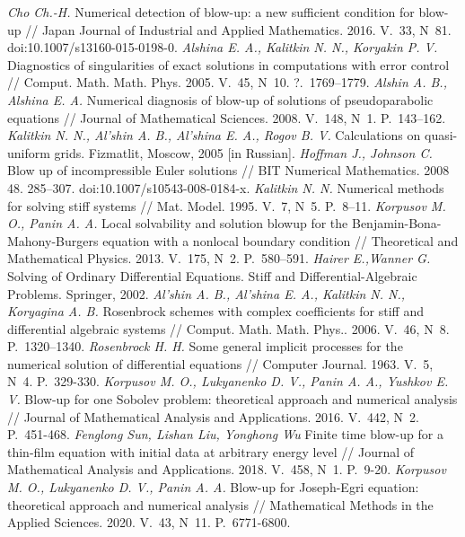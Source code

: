 \documentclass[twoside]{book}
\begin{document}
\begin{CJK*}{GBK}{song}
\begin{thebibliography}{s2}
     {\itshape Cho Ch.-H.} Numerical detection of blow-up: a new sufficient condition for blow-up // Japan Journal of Industrial and Applied Mathematics. 2016. V.~33, N~81. doi:10.1007/s13160-015-0198-0.
     {\itshape Alshina E. A., Kalitkin N. N., Koryakin P. V.} Diagnostics of singularities of exact solutions in computations with error control // Comput. Math. Math. Phys. 2005. V.~45, N~10.  ?.~1769--1779.
     {\itshape Alshin A. B., Alshina E. A.} Numerical diagnosis of blow-up of solutions of pseudoparabolic equations // Journal of Mathematical Sciences. 2008. V.~148, N~1. P.~143--162.
     {\itshape Kalitkin N. N., Al’shin A. B., Al’shina E. A., Rogov B. V.} Calculations on quasi-uniform grids. Fizmatlit, Moscow, 2005 [in Russian].
     {\itshape Hoffman J., Johnson C.} Blow up of incompressible Euler solutions // BIT Numerical Mathematics. 2008 48. 285--307. doi:10.1007/s10543-008-0184-x.
     {\itshape Kalitkin N. N.} Numerical methods for solving stiff systems  // Mat. Model. 1995. V.~7, N~5. P.~8--11.
     {\itshape Korpusov M. O., Panin A. A.} Local solvability and solution blowup for the Benjamin-Bona-Mahony-Burgers equation with a nonlocal boundary condition // Theoretical and Mathematical Physics. 2013. V.~175, N~2. P.~580--591.
     {\itshape Hairer E.,Wanner G.} Solving of Ordinary Differential Equations. Stiff and Differential-Algebraic Problems. Springer, 2002.
     {\itshape Al’shin A. B., Al’shina E. A., Kalitkin N. N., Koryagina A. B.} Rosenbrock schemes with complex coefficients for stiff and differential algebraic systems // Comput. Math. Math. Phys.. 2006. V.~46, N~8.  P.~1320--1340.
     {\itshape Rosenbrock H. H.} Some general implicit processes for the numerical solution of differential equations // Computer Journal. 1963. V.~5, N~4. P.~329-330.
     {\itshape Korpusov M. O., Lukyanenko D. V., Panin A. A., Yushkov E. V.}  Blow-up for one Sobolev problem: theoretical approach and numerical analysis // Journal of Mathematical Analysis and Applications. 2016. V.~442, N~2. P.~451-468.
     {\itshape Fenglong Sun, Lishan Liu, Yonghong Wu}  Finite time blow-up for a thin-film equation with initial data at arbitrary energy level // Journal of Mathematical Analysis and Applications. 2018. V.~458, N~1. P.~9-20.
     {\itshape Korpusov M. O., Lukyanenko D. V., Panin A. A.}  Blow-up for Joseph-Egri equation: theoretical approach and numerical analysis // Mathematical Methods in the Applied Sciences. 2020. V.~43, N~11. P.~6771-6800.



\end{thebibliography}
\end{CJK*}
\end{document}

